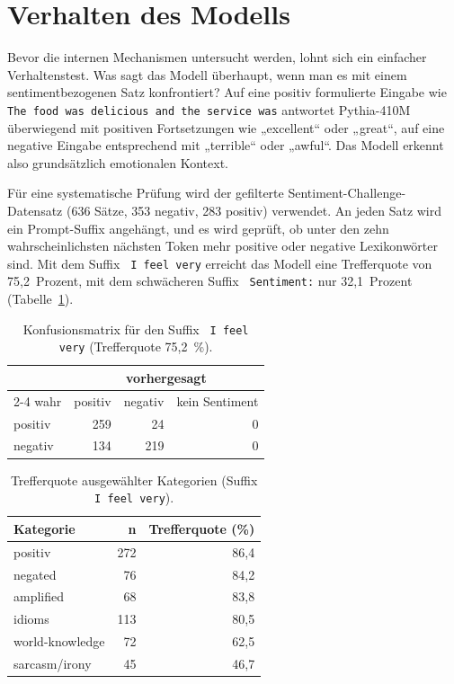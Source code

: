 \section{Verhalten des Modells}

Bevor die internen Mechanismen untersucht werden, lohnt sich ein einfacher Verhaltenstest. Was sagt das Modell überhaupt, wenn man es mit einem sentimentbezogenen Satz konfrontiert? Auf eine positiv formulierte Eingabe wie \texttt{The food was delicious and the service was} antwortet Pythia-410M überwiegend mit positiven Fortsetzungen wie „excellent“ oder „great“, auf eine negative Eingabe entsprechend mit „terrible“ oder „awful“. Das Modell erkennt also grundsätzlich emotionalen Kontext.

Für eine systematische Prüfung wird der gefilterte Sentiment-Challenge-Datensatz (636 Sätze, 353 negativ, 283 positiv) verwendet. An jeden Satz wird ein Prompt-Suffix angehängt, und es wird geprüft, ob unter den zehn wahrscheinlichsten nächsten Token mehr positive oder negative Lexikonwörter sind. Mit dem Suffix \texttt{ I feel very} erreicht das Modell eine Trefferquote von 75,2~Prozent, mit dem schwächeren Suffix \texttt{ Sentiment:} nur 32,1~Prozent (Tabelle~\ref{tab:cm1}).

\begin{table}[htbp]
  \centering
  \caption{Konfusionsmatrix für den Suffix \texttt{ I feel very} (Trefferquote 75,2~\%).}
  \label{tab:cm1}
  \begin{tabular}{lrrr}
    \toprule
    & \multicolumn{3}{c}{vorhergesagt} \\
    \cmidrule(lr){2-4}
    wahr & positiv & negativ & kein Sentiment \\
    \midrule
    positiv & 259 & 24 & 0 \\
    negativ & 134 & 219 & 0 \\
    \bottomrule
  \end{tabular}
\end{table}

\begin{table}[htbp]
  \centering
  \caption{Trefferquote ausgewählter Kategorien (Suffix \texttt{ I feel very}).}
  \label{tab:catacc_short}
  \begin{tabular}{lrr}
    \toprule
    Kategorie & n & Trefferquote (\%) \\
    \midrule
    positiv & 272 & 86,4 \\
    negated & 76 & 84,2 \\
    amplified & 68 & 83,8 \\
    idioms & 113 & 80,5 \\
    world-knowledge & 72 & 62,5 \\
    sarcasm/irony & 45 & 46,7 \\
    \bottomrule
  \end{tabular}
\end{table}

